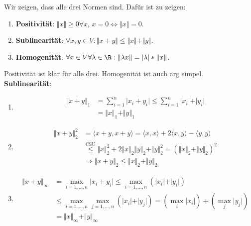 \begin{solution}
  Wir zeigen, dass alle drei Normen sind. Dafür ist zu zeigen:
  \begin{enumerate}
    \item \textbf{Positivität}: \( \Vert x \Vert \geq 0 \forall x \), \( x = 0 \Leftrightarrow \Vert x \Vert = 0 \).
    \item \textbf{Sublinearität}: \( \forall x, y \in V: \Vert x + y \Vert \leq \Vert x \Vert + \Vert y \Vert \).
    \item \textbf{Homogenität}: \( \forall x \in V \forall \lambda \in \R: \Vert \lambda x \Vert = \vert \lambda \vert * \Vert x \Vert \).
  \end{enumerate}
  Positivität ist klar für alle drei. Homogenität ist auch arg simpel. \\
  \textbf{Sublinearität}:
  \begin{enumerate}
    \item \begin{align*}
      \Vert x + y \Vert_1 &= \sum_{i = 1}^n \vert x_i + y_i \vert \leq \sum_{i = 1}^n \vert x_i \vert + \vert y_i \vert \\
      &= \Vert x \Vert_1 + \Vert y \Vert_1
    \end{align*}
    \item \begin{align*}
      \Vert x + y \Vert^2_2 &= \langle x+y, x+y \rangle = \langle x, x \rangle + 2\langle x, y\rangle - \langle y, y \rangle \\
      &\overset{\text{CSU}}{\leq} \Vert x \Vert_2^2 + 2 \Vert x \Vert_2 \Vert y \Vert_2 + \Vert y \Vert_2^2 = {(\Vert x \Vert_2 + \Vert y \Vert_2)}^2 \\
      &\Rightarrow \Vert x +y \Vert_2 \leq \Vert x \Vert_2 + \Vert y \Vert_2
    \end{align*}
    \item \begin{align*}
      \Vert x + y \Vert_\infty &= \max_{i = 1, \dots,n} \vert x_i + y_i \vert \leq \max_{i = 1, \dots, n}(\vert x_i \vert + \vert y_i \vert) \\
      &\leq \max_{i = 1, \dots, n} \max_{j = 1, \dots, n}(\vert x_i \vert + \vert y_j \vert) = (\max_i \vert x_i \vert) + (\max_j \vert y_j \vert) \\
      &= \Vert x \Vert_\infty + \Vert y \Vert_\infty
    \end{align*}
  \end{enumerate}
\end{solution}

